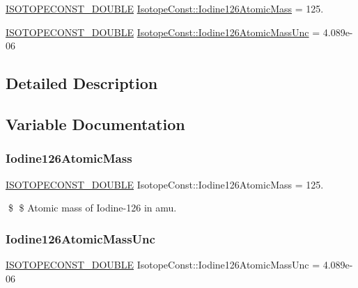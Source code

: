 \begin{DoxyCompactItemize}
\item 
\mbox{\hyperlink{group___isotope_const-_macros_ga8f45a7272ce02c0b4c65c44636ed719a}{I\+S\+O\+T\+O\+P\+E\+C\+O\+N\+S\+T\+\_\+\+D\+O\+U\+B\+LE}} \mbox{\hyperlink{group___isotope_const-_iodine-_i126_gafde523be70211780d582bc947f7346f7}{Isotope\+Const\+::\+Iodine126\+Atomic\+Mass}} = 125.
\item 
\mbox{\hyperlink{group___isotope_const-_macros_ga8f45a7272ce02c0b4c65c44636ed719a}{I\+S\+O\+T\+O\+P\+E\+C\+O\+N\+S\+T\+\_\+\+D\+O\+U\+B\+LE}} \mbox{\hyperlink{group___isotope_const-_iodine-_i126_gaf44325aad14469ed3b8d4370a9ae36aa}{Isotope\+Const\+::\+Iodine126\+Atomic\+Mass\+Unc}} = 4.\+089e-\/06
\end{DoxyCompactItemize}


\subsection{Detailed Description}


\subsection{Variable Documentation}
\mbox{\label{group___isotope_const-_iodine-_i126_gafde523be70211780d582bc947f7346f7}} 
\subsubsection{\texorpdfstring{Iodine126\+Atomic\+Mass}{Iodine126AtomicMass}}
{\footnotesize\ttfamily \mbox{\hyperlink{group___isotope_const-_macros_ga8f45a7272ce02c0b4c65c44636ed719a}{I\+S\+O\+T\+O\+P\+E\+C\+O\+N\+S\+T\+\_\+\+D\+O\+U\+B\+LE}} Isotope\+Const\+::\+Iodine126\+Atomic\+Mass = 125.}

\$ \$ Atomic mass of Iodine-\/126 in amu. \mbox{\label{group___isotope_const-_iodine-_i126_gaf44325aad14469ed3b8d4370a9ae36aa}} 
\subsubsection{\texorpdfstring{Iodine126\+Atomic\+Mass\+Unc}{Iodine126AtomicMassUnc}}
{\footnotesize\ttfamily \mbox{\hyperlink{group___isotope_const-_macros_ga8f45a7272ce02c0b4c65c44636ed719a}{I\+S\+O\+T\+O\+P\+E\+C\+O\+N\+S\+T\+\_\+\+D\+O\+U\+B\+LE}} Isotope\+Const\+::\+Iodine126\+Atomic\+Mass\+Unc = 4.\+089e-\/06}

